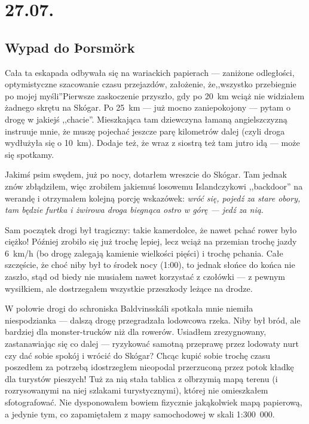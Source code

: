 \chapter*{27.07.}

\section*{Wypad do Þorsmörk}


Cała ta eskapada odbywała się na wariackich papierach --- zaniżone odległości, optymistyczne szacowanie czasu przejazdów, założenie, że\linebreak ,,wszystko przebiegnie po mojej myśli''\textellipsis Pierwsze zaskoczenie przyszło, gdy po 20~km wciąż nie widziałem żadnego skrętu na Skógar. Po 25~km --- już mocno zaniepokojony --- pytam o drogę w jakiejś ,,chacie''. Mieszkająca tam dziewczyna łamaną angielszczyzną instruuje mnie, że muszę pojechać jeszcze parę kilometrów dalej (czyli droga wydłużyła się o 10~km). Dodaje też, że wraz z siostrą też tam jutro idą --- może się spotkamy.

Jakimś psim swędem, już po nocy, dotarłem wreszcie do Skógar. Tam jednak znów zbłądziłem, więc zrobiłem jakiemuś losowemu Islandczykowi ,,backdoor'' na werandę i otrzymałem kolejną porcję wskazówek: \emph{wróć się, pojedź za stare obory, tam będzie furtka i żwirowa droga biegnąca ostro w górę --- jedź za nią}.

Sam początek drogi był tragiczny: takie kamerdolce, że nawet pchać rower było ciężko! Później zrobiło się już trochę lepiej, lecz wciąż na przemian trochę jazdy 6~km/h (bo drogę zalegają kamienie wielkości pięści) i trochę pchania. Całe szczęście, że choć niby był to środek nocy (1:00), to jednak słońce do końca nie zaszło, stąd od biedy nie musiałem nawet korzystać z czołówki --- z pewnym wysiłkiem, ale dostrzegałem wszystkie przeszkody leżące na drodze.

W połowie drogi do schroniska Baldvinsskáli spotkała mnie niemiła niespodzianka --- dalszą drogę przegradzała lodowcowa rzeka. Niby był bród, ale bardziej dla monster-trucków niż dla rowerów. Usiadłem zrezygnowany, zastanawiając się co dalej --- ryzykować samotną przeprawę przez lodowaty nurt czy dać sobie spokój i wrócić do Skógar? Chcąc kupić sobie trochę czasu poszedłem za potrzebą i\textellipsis dostrzegłem nieopodal przerzuconą przez potok kładkę dla turystów pieszych! Tuż za nią stała tablica z olbrzymią mapą terenu (i rozrysowanymi na niej szlakami turystycznymi), której nie omieszkałem sfotografować. Nie dysponowałem bowiem fizycznie jakąkolwiek mapą papierową, a jedynie tym, co zapamiętałem z mapy samochodowej w skali  1:300~000.

